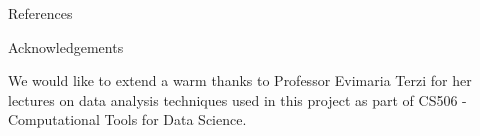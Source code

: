 \documentclass[final]{beamer}
\newlength{\sepwid}
\newlength{\onecolwid}
\begin{document}
\begin{frame}[t]
\begin{columns}[t]
\begin{column}{\onecolwid}

\begin{block}{References}


%


\end{block}



\begin{block}{Acknowledgements}

We would like to extend a warm thanks to Professor Evimaria Terzi for her lectures on data analysis techniques used in this project as part of CS506 - Computational Tools for Data Science.


\end{block}






\end{column} %
\begin{column}{\sepwid}\end{column} %

\end{columns} %

\vspace*{\fill}

\end{frame} %
\end{document}
